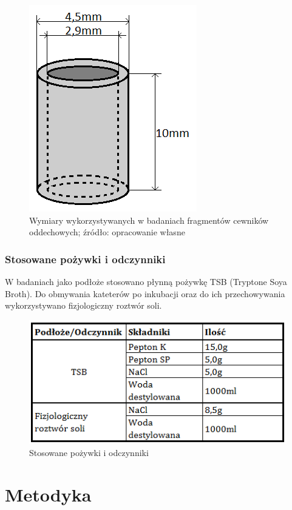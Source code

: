 \documentclass[11pt,a4paper]{report}
\begin{document}
\begin{figure}[!h]
\begin{center}
\includegraphics[scale=0.6]{img/stent.png}
\caption{Wymiary wykorzystywanych w badaniach fragmentów cewników oddechowych; źródło: opracowanie własne}\label{stent}
\end{center} 
\end{figure}
\subsection{Stosowane pożywki i odczynniki}
W badaniach jako podłoże stosowano płynną pożywkę TSB (Tryptone Soya Broth). Do obmywania kateterów po inkubacji oraz do ich przechowywania wykorzystywano fizjologiczny roztwór soli.

\begin{figure}[!h]
\caption{Stosowane pożywki i odczynniki}\label{TSB}
\begin{center}
\includegraphics[scale=1]{img/mgr_podloze_popr.png}
\end{center} 
\end{figure}


\chapter{Metodyka}
\end{document}
